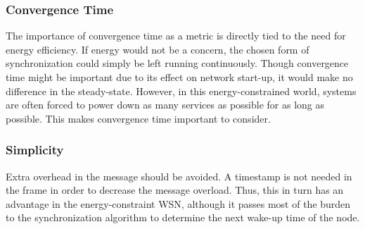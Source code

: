 \documentclass[a4paper,10pt]{report}
\begin{document}
\subsubsection{\textbf{Convergence Time}} The importance of convergence time as a metric is directly tied to the need for energy efficiency. If energy would not be a concern, the chosen form of synchronization could simply be left running continuously. Though convergence time might be important due to its effect on network start-up, it would make no difference in the steady-state. However, in this energy-constrained world, systems are often forced to power down as many services as possible for as long as possible. This makes
convergence time important to consider.
\subsubsection{\textbf{Simplicity}} Extra overhead in the message should be avoided. A timestamp is not needed in the frame in order to decrease the message overload. Thus, this in turn has an advantage in the energy-constraint WSN, although it passes most of the burden to the synchronization algorithm to determine the next wake-up time of the node.
\end{document}
